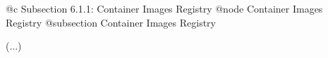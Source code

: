 @c Subsection 6.1.1: Container Images Registry
@node Container Images Registry
@subsection Container Images Registry

(...)
